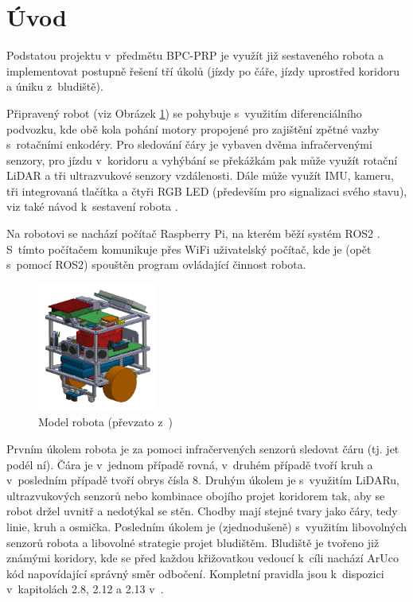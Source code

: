 \section{Úvod}

Podstatou projektu v~předmětu BPC-PRP je využít již sestaveného robota a implementovat postupně řešení tří úkolů (jízdy po čáře, jízdy uprostřed koridoru a úniku z~bludiště).

Připravený robot (viz Obrázek \ref{fig:robot_obr}) se pohybuje s~využitím diferenciálního podvozku, kde obě kola pohání motory propojené pro zajištění zpětné vazby s~rotačními enkodéry. Pro sledování čáry je vybaven dvěma infračervenými senzory, pro jízdu v~koridoru a vyhýbání se překážkám pak může využít rotační LiDAR a tři ultrazvukové senzory vzdálenosti. Dále může využít IMU, kameru, tři integrovaná tlačítka a čtyři RGB LED (především pro signalizaci svého stavu), viz také návod k~sestavení robota \cite{robot}.

Na robotovi se nachází počítač Raspberry Pi, na kterém běží systém ROS2 \cite{ros}. S~tímto počítačem komunikuje přes WiFi uživatelský počítač, kde je (opět s~pomocí ROS2) spouštěn program ovládající činnost robota. 

\begin{figure}[h]
    \centering
    \includegraphics[width=0.35\textwidth]{images/fenrir.png}
    \caption{Model robota (převzato z~\cite{prez1})}
    \label{fig:robot_obr}
\end{figure}

Prvním úkolem robota je za pomoci infračervených senzorů sledovat čáru (tj. jet podél ní). Čára je v~jednom případě rovná, v~druhém případě tvoří kruh a v~posledním případě tvoří obrys čísla 8. Druhým úkolem je s~využitím LiDARu, ultrazvukových senzorů nebo kombinace obojího projet koridorem tak, aby se robot držel uvnitř a nedotýkal se stěn. Chodby mají stejné tvary jako čáry, tedy linie, kruh a osmička. Posledním úkolem je (zjednodušeně) s~využitím libovolných senzorů robota a libovolné strategie projet bludištěm. Bludiště je tvořeno již známými koridory, kde se před každou křižovatkou vedoucí k~cíli nachází ArUco kód napovídající správný směr odbočení. Kompletní pravidla jsou k~dispozici v~kapitolách 2.8, 2.12 a 2.13 v~\cite{lab}.
